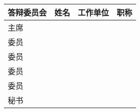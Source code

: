 
\begin{committee}
\renewcommand\arraystretch{2}

\begin{table}[!h]
\centering
\begin{tabular}{|p{2.6cm}<{\centering}|p{3cm}<{\centering}|p{5cm}<{\centering}|p{2.5cm}<{\centering}|}
\hline
\textbf{答辩委员会} & \textbf{姓名} & \textbf{工作单位} & \textbf{职称} \\
\hline
主席 &   &   &   \\
\hline
委员 &   &   &   \\
\hline
委员 &   &   &   \\
\hline
委员 &   &   &   \\
\hline
委员 &   &   &   \\
\hline
秘书 &   &   &   \\
\hline
\end{tabular}	
\end{table}
\end{committee}